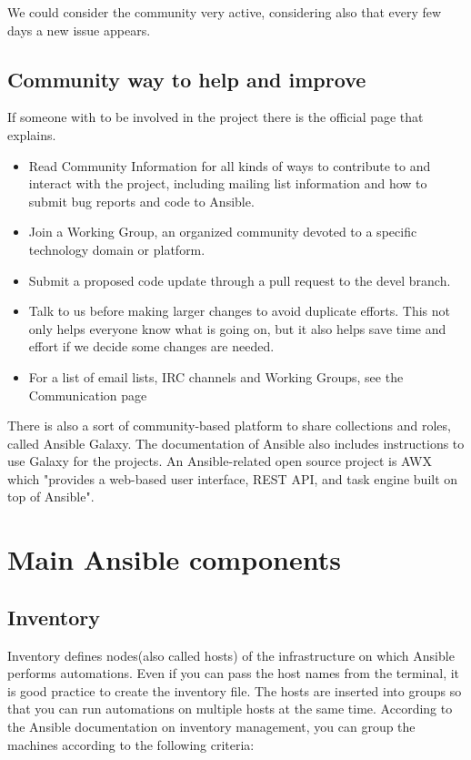 \documentclass[12pt,a4paper,openright,twoside]{book}
\begin{document}
We could consider the community very active, considering also that every few days a new issue appears.

\subsection{Community way to help and improve}
If someone with to be involved in the project there is the official page that explains\cite {ansibleGithub}.

\begin{itemize}
    \item Read Community Information for all kinds of ways to contribute to and interact with the project, including mailing list information and how to submit bug reports and code to Ansible.
    \item Join a Working Group, an organized community devoted to a specific technology domain or platform.
    \item Submit a proposed code update through a pull request to the devel branch.
    \item Talk to us before making larger changes to avoid duplicate efforts. This not only helps everyone know what is going on, but it also helps save time and effort if we decide some changes are needed.
    \item For a list of email lists, IRC channels and Working Groups, see the Communication page
\end{itemize}

There is also a sort of community-based platform to share collections and roles, called Ansible Galaxy\cite{ansibleGalaxy}.
The documentation of Ansible also includes instructions to use Galaxy for the projects.
An Ansible-related open source project is AWX which "provides a web-based user interface, REST API, and task engine built on top of Ansible"\cite{ansibleAWX}.

\section{Main Ansible components}

\subsection{Inventory}
Inventory defines nodes(also called hosts) of the infrastructure on which Ansible performs automations. Even if you can pass the host names from the terminal, it is good practice to create the inventory file.
The hosts are inserted into groups so that you can run automations on multiple hosts at the same time.
According to the Ansible documentation on inventory management\cite{ansibleDocInventory}, you can group the machines according to the following criteria:
            
\end{document}
